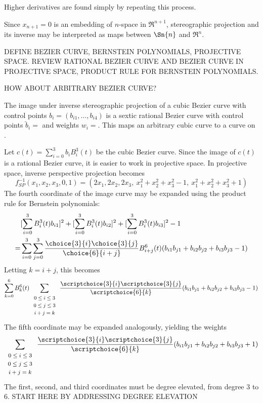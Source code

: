 \documentclass[11pt]{article}
\begin{document}
Higher derivatives are found simply by repeating this process.

Since $x_{n+1}=0$ is an embedding of $n$-space in $\Re^{n+1}$,
stereographic projection and its inverse may be interpreted as maps between 
$\Sn{n}$ and $\Re^n$.

DEFINE BEZIER CURVE, BERNSTEIN POLYNOMIALS, PROJECTIVE SPACE.
REVIEW RATIONAL BEZIER CURVE AND BEZIER CURVE IN PROJECTIVE SPACE,
PRODUCT RULE FOR BERNSTEIN POLYNOMIALS.

HOW ABOUT ARBITRARY BEZIER CURVE?

\begin{theorem}
\label{thm:imagecurve}
The image under inverse stereographic projection 
of a cubic Bezier curve with control points $b_i = (b_{i1},\ldots,b_{i4})$
is a sextic rational Bezier curve 
with control points $\breve{b}_i = $ 
and weights $w_i = $.
This maps an arbitrary cubic curve to a curve on .
\end{theorem}
\prf
Let $c(t) = \sum_{i=0}^3 b_i B_i^3(t)$ be the cubic Bezier curve.
Since the image of $c(t)$ is a rational Bezier curve,
it is easier to work in projective space.
In projective space, inverse perspective projection becomes
\[
f^{-1}_{SP}(x_1,x_2,x_3,0,1) = (2x_1, 2x_2, 2x_3,\ x_1^2 + x_2^2 + x_3^2 - 1, 
                                \ x_1^2 + x_2^2 + x_3^2 + 1)
\]
The fourth coordinate of the image curve may be expanded using the product rule
for Bernstein polynomials:
\begin{eqnarray*}
& [\sum_{i=0}^3 B_i^3(t) b_{i1}]^2 + 
[\sum_{i=0}^3 B_i^3(t) b_{i2}]^2 + 
[\sum_{i=0}^3 B_i^3(t) b_{i3}]^2 - 1 \\
= & \sum_{i=0}^3 \sum_{j=0}^3 
	\frac{\choice{3}{i} \choice{3}{j}}{\choice{6}{i+j}}
       B^6_{i+j}(t) (b_{i1} b_{j1} + b_{i2} b_{j2} + b_{i3} b_{j3} - 1) 
\end{eqnarray*}
Letting $k=i+j$, this becomes
\[ \sum_{k=0}^6 B_k^6(t) 
	\sum_{\begin{array}{c}  \mbox{\footnotesize{$0 \leq i \leq 3$}} \\ 
	                        \mbox{\footnotesize{$0 \leq j \leq 3$}} \\ 
			        \mbox{\footnotesize{$i+j=k$}}
			     \end{array}} 
	\frac{\scriptchoice{3}{i} \scriptchoice{3}{j}}{\scriptchoice{6}{k}}
	(b_{i1} b_{j1} + b_{i2} b_{j2} + b_{i3} b_{j3} - 1) 
\]
The fifth coordinate may be expanded analogously, yielding the weights
\[
	\sum_{\begin{array}{c}  \mbox{\footnotesize{$0 \leq i \leq 3$}} \\ 
	                        \mbox{\footnotesize{$0 \leq j \leq 3$}} \\ 
			        \mbox{\footnotesize{$i+j=k$}}
			     \end{array}} 
	\frac{\scriptchoice{3}{i} \scriptchoice{3}{j}}{\scriptchoice{6}{k}}
	(b_{i1} b_{j1} + b_{i2} b_{j2} + b_{i3} b_{j3} + 1) 
\]
The first, second, and third coordinates must be degree elevated,
from degree 3 to 6.
START HERE BY ADDRESSING DEGREE ELEVATION
\QED
\end{document}
